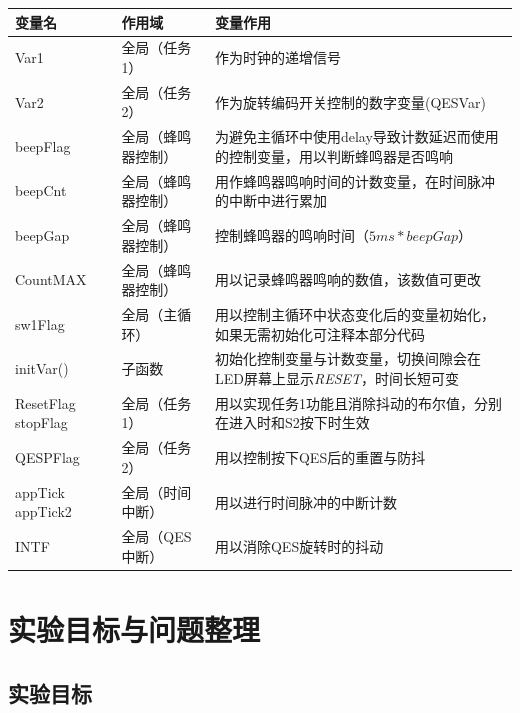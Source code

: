 \documentclass[12pt]{article}
\begin{document}
\begin{table}[htbp]
	\centering
	\begin{tabular*}{16cm}{p{60pt}p{110pt}p{250pt}}
		\toprule
		变量名 & 作用域 & 变量作用 \\
		\midrule
		Var1 & 全局（任务1） & 作为时钟的递增信号\\
		Var2 & 全局（任务2） & 作为旋转编码开关控制的数字变量(QESVar)\\
		beepFlag & 全局（蜂鸣器控制）& 为避免主循环中使用delay导致计数延迟而使用的控制变量，用以判断蜂鸣器是否鸣响\\
		beepCnt & 全局（蜂鸣器控制） & 用作蜂鸣器鸣响时间的计数变量，在时间脉冲的中断中进行累加\\
		beepGap & 全局（蜂鸣器控制） & 控制蜂鸣器的鸣响时间（$5ms * beepGap$）\\
		CountMAX & 全局（蜂鸣器控制）& 用以记录蜂鸣器鸣响的数值，该数值可更改\\
		sw1Flag & 全局（主循环） & 用以控制主循环中状态变化后的变量初始化，如果无需初始化可注释本部分代码\\
		initVar() & 子函数 & 初始化控制变量与计数变量，切换间隙会在LED屏幕上显示\emph{RESET}，时间长短可变\\
		ResetFlag stopFlag & 全局（任务1） & 用以实现任务1功能且消除抖动的布尔值，分别在进入时和S2按下时生效\\

		QESPFlag & 全局（任务2） & 用以控制按下QES后的重置与防抖\\
		appTick appTick2 & 全局（时间中断） & 用以进行时间脉冲的中断计数\\
		INTF & 全局（QES中断） & 用以消除QES旋转时的抖动\\



		\bottomrule
	\end{tabular*}
\end{table}

\section{实验目标与问题整理}
\subsection{实验目标}
\end{document}
